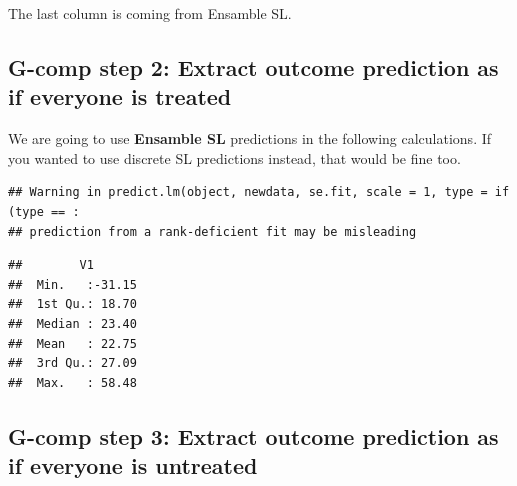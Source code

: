 \documentclass[
]{book}
\newenvironment{Shaded}{\begin{snugshade}}{\end{snugshade}}
\newcommand{\AttributeTok}[1]{\textcolor[rgb]{0.77,0.63,0.00}{#1}}
\newcommand{\DecValTok}[1]{\textcolor[rgb]{0.00,0.00,0.81}{#1}}
\newcommand{\FunctionTok}[1]{\textcolor[rgb]{0.00,0.00,0.00}{#1}}
\newcommand{\NormalTok}[1]{#1}
\newcommand{\OtherTok}[1]{\textcolor[rgb]{0.56,0.35,0.01}{#1}}
\newcommand{\SpecialCharTok}[1]{\textcolor[rgb]{0.00,0.00,0.00}{#1}}
\newcommand{\StringTok}[1]{\textcolor[rgb]{0.31,0.60,0.02}{#1}}
\begin{document}
The last column is coming from Ensamble SL.

\hypertarget{g-comp-step-2-extract-outcome-prediction-as-if-everyone-is-treated-2}{%
\subsection{G-comp step 2: Extract outcome prediction as if everyone is treated}\label{g-comp-step-2-extract-outcome-prediction-as-if-everyone-is-treated-2}}

We are going to use \textbf{Ensamble SL} predictions in the following calculations. If you wanted to use discrete SL predictions instead, that would be fine too.

\begin{Shaded}
\end{Shaded}

\begin{verbatim}
## Warning in predict.lm(object, newdata, se.fit, scale = 1, type = if (type == :
## prediction from a rank-deficient fit may be misleading
\end{verbatim}

\begin{Shaded}
\end{Shaded}

\begin{verbatim}
##        V1        
##  Min.   :-31.15  
##  1st Qu.: 18.70  
##  Median : 23.40  
##  Mean   : 22.75  
##  3rd Qu.: 27.09  
##  Max.   : 58.48
\end{verbatim}

\hypertarget{g-comp-step-3-extract-outcome-prediction-as-if-everyone-is-untreated-2}{%
\subsection{G-comp step 3: Extract outcome prediction as if everyone is untreated}\label{g-comp-step-3-extract-outcome-prediction-as-if-everyone-is-untreated-2}}
\end{document}
